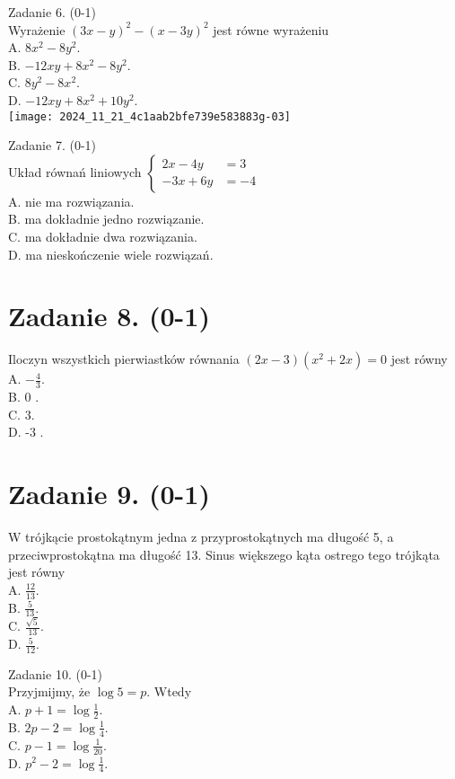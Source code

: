 \documentclass[10pt]{article}
\begin{document}
Zadanie 6. (0-1)\\
Wyrażenie \((3 x-y)^{2}-(x-3 y)^{2}\) jest równe wyrażeniu\\
A. \(8 x^{2}-8 y^{2}\).\\
B. \(-12 x y+8 x^{2}-8 y^{2}\).\\
C. \(8 y^{2}-8 x^{2}\).\\
D. \(-12 x y+8 x^{2}+10 y^{2}\).\\
\texttt{[image: 2024\_11\_21\_4c1aab2bfe739e583883g-03]}

Zadanie 7. (0-1)\\
Układ równań liniowych \(\left\{\begin{aligned} 2 x-4 y & =3 \\ -3 x+6 y & =-4\end{aligned}\right.\)\\
A. nie ma rozwiązania.\\
B. ma dokładnie jedno rozwiązanie.\\
C. ma dokładnie dwa rozwiązania.\\
D. ma nieskończenie wiele rozwiązań.

\section*{Zadanie 8. (0-1)}
Iloczyn wszystkich pierwiastków równania \((2 x-3)\left(x^{2}+2 x\right)=0\) jest równy\\
A. \(-\frac{4}{3}\).\\
B. 0 .\\
C. 3.\\
D. -3 .

\section*{Zadanie 9. (0-1)}
W trójkącie prostokątnym jedna z przyprostokątnych ma długość 5, a przeciwprostokątna ma długość 13. Sinus większego kąta ostrego tego trójkąta jest równy\\
A. \(\frac{12}{13}\).\\
B. \(\frac{5}{13}\).\\
C. \(\frac{\sqrt{5}}{13}\).\\
D. \(\frac{5}{12}\).

Zadanie 10. (0-1)\\
Przyjmijmy, że \(\log 5=p\). Wtedy\\
A. \(p+1=\log \frac{1}{2}\).\\
B. \(2 p-2=\log \frac{1}{4}\).\\
C. \(p-1=\log \frac{1}{20}\).\\
D. \(p^{2}-2=\log \frac{1}{4}\).
\end{document}
